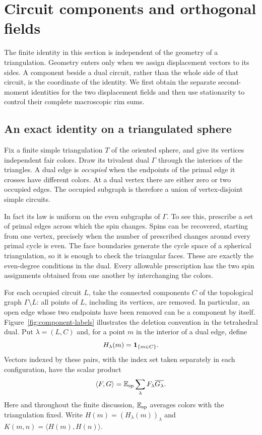 \section{Circuit components and orthogonal fields}\label{sec:fields}

The finite identity in this section is independent of the geometry of a
triangulation.  Geometry enters only when we assign displacement vectors to
its sides.  A component beside a dual circuit, rather than the whole side of
that circuit, is the coordinate of the identity. We first obtain the
separate second-moment identities for the two displacement fields and
then use stationarity to control their complete macroscopic rim sums.

\subsection{An exact identity on a triangulated sphere}

Fix a finite simple triangulation $T$ of the oriented sphere, and give its
vertices independent fair colors.  Draw its trivalent dual $\Gamma$ through
the interiors of the triangles.  A dual edge is \emph{occupied} when the
endpoints of the primal edge it crosses have different colors.  At a dual
vertex there are either zero or two occupied edges.  The occupied subgraph
is therefore a union of vertex-disjoint simple circuits.

In fact its law is uniform on the even subgraphs of $\Gamma$.  To see this,
prescribe a set of primal edges across which the spin changes.  Spins can be
recovered, starting from one vertex, precisely when the number of prescribed
changes around every primal cycle is even.  The face boundaries generate the
cycle space of a spherical triangulation, so it is enough to check the
triangular faces.  These are exactly the even-degree conditions in the dual.
Every allowable prescription has the two spin assignments obtained from one
another by interchanging the colors.

For each occupied circuit $L$, take the connected components $C$ of the
topological graph $\Gamma\setminus L$: all points of $L$, including its
vertices, are removed.  In particular, an open edge whose two endpoints have
been removed can be a component by itself.  Figure~\ref{fig:component-labels}
illustrates the deletion convention in the tetrahedral dual.
Put $\lambda=(L,C)$ and, for a
point $m$ in the interior of a dual edge, define
\[
 H_\lambda(m)=\mathbf 1_{\{m\in C\}}.
\]
Vectors indexed by these pairs, with the index set taken separately in each
configuration, have the scalar product
\[
 \langle F,G\rangle
   =\mathbb E_{\mathrm{sp}}\sum_\lambda F_\lambda\overline{G_\lambda}.
\]
Here and throughout the finite discussion, $\mathbb E_{\mathrm{sp}}$ averages colors with the
triangulation fixed.  Write $H(m)=(H_\lambda(m))_\lambda$ and
$K(m,n)=\langle H(m),H(n)\rangle$.

